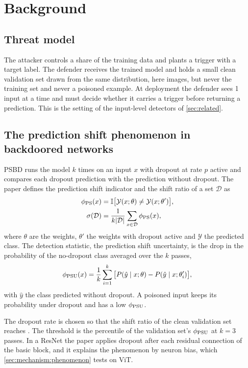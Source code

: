\section{Background}
\label{sec:background}

\subsection{Threat model}
The attacker controls a share of the training data and plants a trigger with a target label. The defender receives the trained model and holds a small clean validation set drawn from the same distribution, here \HeldoutSize{} images, but never the training set and never a poisoned example. At deployment the defender sees 1 input at a time and must decide whether it carries a trigger before returning a prediction. This is the setting of the input-level detectors of \cref{sec:related}.

\subsection{The prediction shift phenomenon in backdoored networks}
PSBD \cite{li2025psbd} runs the model $k$ times on an input $x$ with dropout at rate $p$ active and compares each dropout prediction with the prediction without dropout. The paper defines the prediction shift indicator and the shift ratio of a set $\mathcal{D}$ as
\begin{equation}
  \begin{split}
    \phi_{\mathrm{PS}}(x) &= \mathbb{I}\big[\mathcal{Y}(x;\theta) \neq \mathcal{Y}(x;\theta')\big], \\
    \sigma(\mathcal{D}) &= \frac{1}{k|\mathcal{D}|}\sum_{x\in\mathcal{D}} \phi_{\mathrm{PS}}(x),
  \end{split}
\end{equation}
where $\theta$ are the weights, $\theta'$ the weights with dropout active and $\mathcal{Y}$ the predicted class. The detection statistic, the prediction shift uncertainty, is the drop in the probability of the no-dropout class averaged over the $k$ passes,
\begin{equation}
  \phi_{\mathrm{PSU}}(x) = \frac{1}{k}\sum_{i=1}^{k}
    \big[ P(\hat y \mid x;\theta) - P(\hat y \mid x;\theta'_i) \big],
\end{equation}
with $\hat y$ the class predicted without dropout. A poisoned input keeps its probability under dropout and has a low $\phi_{\mathrm{PSU}}$.

The dropout rate is chosen so that the shift ratio of the clean validation set reaches \AdaptiveShiftTarget{}. The threshold is the \HeadlineQuantilePercent{} percentile of the validation set's $\phi_{\mathrm{PSU}}$ at $k = 3$ passes. In a ResNet the paper applies dropout after each residual connection of the basic block, and it explains the phenomenon by neuron bias, which \cref{sec:mechanism:phenomenon} tests on ViT.

